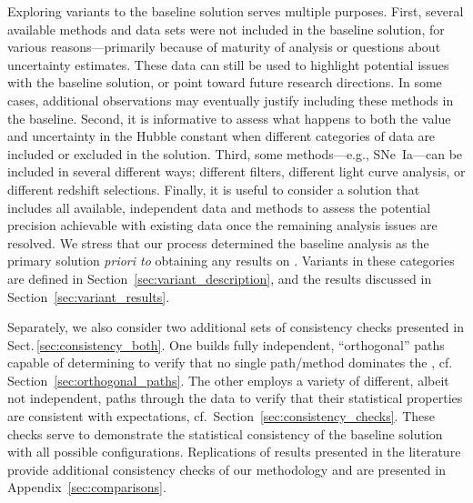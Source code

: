 Exploring variants to the baseline solution serves multiple purposes.  First, several available methods and data sets were not included in the baseline solution, for various reasons---primarily because of maturity of analysis or questions about uncertainty estimates. These data can still be used to highlight potential issues with the baseline solution, or point toward future research directions. In some cases, additional observations may eventually justify including these methods in the baseline. Second, it is informative to assess what happens to both the value and uncertainty in the Hubble constant when different categories of data are included or excluded in the solution. Third, some methods\hbox{---}e.g., SNe~Ia\hbox{---}can be included in several different ways; different filters, different light curve analysis, or different redshift selections. Finally, it is useful to consider a solution that includes all available, independent data and methods to assess the potential precision achievable with existing data once the remaining analysis issues are resolved. We stress that our process determined the baseline analysis as the primary solution \textit{priori to} obtaining any results on \Hcst{}. 
Variants in these categories are defined in Section~\ref{sec:variant_description}, and the results discussed in Section~\ref{sec:variant_results}.

Separately, we also consider two additional sets of consistency checks presented in Sect.\,\ref{sec:consistency_both}. One builds fully independent, ``orthogonal'' paths capable of determining \Hcst{} to verify that no single path/method dominates the \DN{}, cf. Section~\ref{sec:orthogonal_paths}.
The other employs a variety of different, albeit not independent, paths through the data to verify that their statistical properties are consistent with expectations, cf.~Section~\ref{sec:consistency_checks}. These checks serve to demonstrate the statistical consistency of the baseline solution with all possible configurations. Replications of results presented in the literature provide additional consistency checks of our methodology and are presented in Appendix~\ref{sec:comparisons}.


